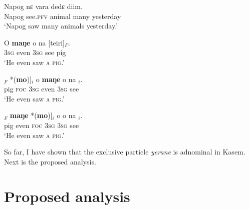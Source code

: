 \documentclass[output=paper,colorlinks,citecolor=brown,draftmode
]{langscibook}
\begin{document}
\ea
\begin{xlist}

\ex \label{ex:Aremu:Kasem: AwF maŋe 1}
\gll Napog nɛ vara dedɛ diim.\\
	Napog see.\textsc{pfv} animal many yesterday\\
\glt `Napog saw many animals yesterday.'
		
\ex \label{ex:Aremu:Kasem: AwF maŋe 2}
\gll O \textbf{maŋe} o na [teiri]$_F$.\\
	3\textsc{sg} even 3\textsc{sg} see pig\\
\glt `He even saw \textsc{a pig}.'
        
\ex \label{ex:Aremu:Kasem: AwF maŋe 3}
\gll [[Teiri]$_F$ *(\textbf{mo})]$_i$ o \textbf{maŋe} o na \uline{\hspace{0.5cm}}$_i$.\\
	pig \textsc{foc} 3\textsc{sg} even 3\textsc{sg} see\\
\glt `He even saw \textsc{a pig}.'

\ex \label{ex:Aremu:Kasem: AwF maŋe 4}
\gll *[[Teiri]$_F$ \textbf{maŋe} *(\textbf{mo})]$_i$ o \uline{\hspace{0.5cm}} o na \uline{\hspace{0.5cm}}$_i$.\\
	pig even \textsc{foc} 3\textsc{sg} {} 3\textsc{sg} see\\
\glt `He even saw \textsc{a pig}.'

\end{xlist}
\z

So far, I have shown that the exclusive particle \textit{yerane} is adnominal in Kasem. Next is the proposed analysis. 


\section{Proposed analysis} \label{sec:Aremu:ProposedAnalysis}
\end{document}
